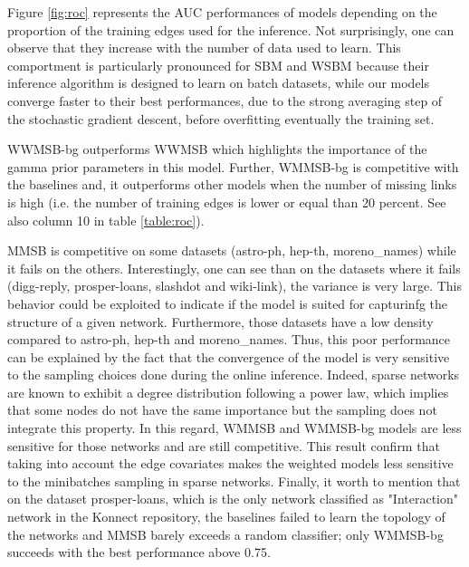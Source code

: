 Figure \ref{fig:roc} represents the AUC performances of models depending on the proportion of the training edges used for the inference. Not surprisingly, one can observe that they increase with the number of data used to learn. This comportment is particularly pronounced for SBM and WSBM because their inference algorithm is designed to learn on batch datasets, while our models converge faster to their best performances, due to the strong averaging step of the stochastic gradient descent, before overfitting eventually the training set.

WWMSB-bg outperforms WWMSB which highlights the importance of the gamma prior parameters in this model. Further, WMMSB-bg is competitive with the baselines and, it outperforms other models when the number of missing links is high (i.e. the number of training edges is lower or equal than 20 percent. See also column 10 in table \ref{table:roc}).
 
MMSB is competitive on some datasets (astro-ph, hep-th, moreno\_names) while it fails on the others. Interestingly, one can see than on the datasets where it fails (digg-reply, prosper-loans, slashdot and wiki-link), the variance is very large. This behavior could be exploited to indicate if the model is suited for capturinfg the structure of a given network. Furthermore, those datasets have a low density compared to astro-ph, hep-th and moreno\_names. Thus, this poor performance can be explained by the fact that the convergence of the model is very sensitive to the sampling choices done during the online inference. Indeed, sparse networks are known to exhibit a degree distribution following a power law, which implies that some nodes do not have the same importance but the sampling does not integrate this property. In this regard, WMMSB and WMMSB-bg models are less sensitive for those networks and are still competitive. This result confirm  that taking into account the edge covariates makes the weighted models less sensitive to the minibatches sampling in sparse networks. Finally, it worth to mention that on the dataset prosper-loans, which is the only network classified as "Interaction" network in the Konnect repository, the baselines failed to learn the topology of the networks and MMSB barely exceeds a random classifier; only WMMSB-bg succeeds with the best performance above 0.75.



\begin{table}
\centering
	
\label{table:roc}
\end{table}




